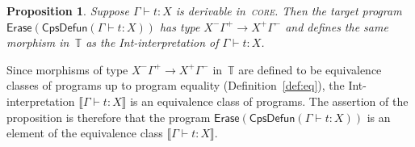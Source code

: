 \documentclass{LMCS}
\theoremstyle{definition}
\theoremstyle{plain}
\newtheorem{proposition}[thm]{Proposition}
\newcommand{\kw}[1]{\mathsf{#1}}
\newcommand{\SeqTm}[3]{#1 \vdash #2 \colon #3}
\newcommand{\TT}{\mathbb{T}}
\newcommand{\sem}[1]{\llbracket #1 \rrbracket}
\begin{document}
\begin{proposition}
  \label{prop:simple}
  Suppose 
  $\SeqTm{\Gamma}{t}{X}$ is derivable in~\textsc{core}.
  Then the target program
  $\kw{Erase}(\kw{CpsDefun}(\SeqTm{\Gamma}{t}{X}))$ 
  has type $X^-\Gamma^+ \to X^+\Gamma^-$ and 
  defines the same morphism in~$\TT$ as the Int-interpretation 
  of\/ $\SeqTm{\Gamma}{t}{X}$.
\end{proposition}
\noindent
Since morphisms of type $X^-\Gamma^+ \to X^+\Gamma^-$ in~$\TT$ are 
defined to be equivalence classes of programs up to program equality 
(Definition~\ref{def:eq}),
the Int-interpretation $\sem{\SeqTm{\Gamma}{t}{X}}$ is an equivalence 
class of programs. The assertion of the proposition is therefore that the program
$\kw{Erase}(\kw{CpsDefun}(\SeqTm{\Gamma}{t}{X}))$ is an element of
the equivalence class $\sem{\SeqTm{\Gamma}{t}{X}}$.
\end{document}
